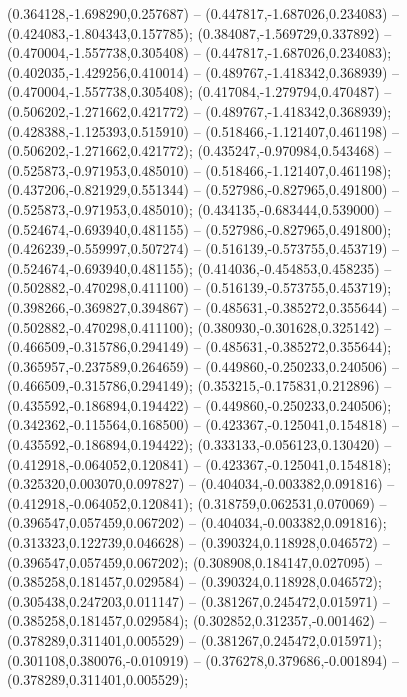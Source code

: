  (0.364128,-1.698290,0.257687) -- (0.447817,-1.687026,0.234083) -- (0.424083,-1.804343,0.157785);
 (0.384087,-1.569729,0.337892) -- (0.470004,-1.557738,0.305408) -- (0.447817,-1.687026,0.234083);
 (0.402035,-1.429256,0.410014) -- (0.489767,-1.418342,0.368939) -- (0.470004,-1.557738,0.305408);
 (0.417084,-1.279794,0.470487) -- (0.506202,-1.271662,0.421772) -- (0.489767,-1.418342,0.368939);
 (0.428388,-1.125393,0.515910) -- (0.518466,-1.121407,0.461198) -- (0.506202,-1.271662,0.421772);
 (0.435247,-0.970984,0.543468) -- (0.525873,-0.971953,0.485010) -- (0.518466,-1.121407,0.461198);
 (0.437206,-0.821929,0.551344) -- (0.527986,-0.827965,0.491800) -- (0.525873,-0.971953,0.485010);
 (0.434135,-0.683444,0.539000) -- (0.524674,-0.693940,0.481155) -- (0.527986,-0.827965,0.491800);
 (0.426239,-0.559997,0.507274) -- (0.516139,-0.573755,0.453719) -- (0.524674,-0.693940,0.481155);
 (0.414036,-0.454853,0.458235) -- (0.502882,-0.470298,0.411100) -- (0.516139,-0.573755,0.453719);
 (0.398266,-0.369827,0.394867) -- (0.485631,-0.385272,0.355644) -- (0.502882,-0.470298,0.411100);
 (0.380930,-0.301628,0.325142) -- (0.466509,-0.315786,0.294149) -- (0.485631,-0.385272,0.355644);
 (0.365957,-0.237589,0.264659) -- (0.449860,-0.250233,0.240506) -- (0.466509,-0.315786,0.294149);
 (0.353215,-0.175831,0.212896) -- (0.435592,-0.186894,0.194422) -- (0.449860,-0.250233,0.240506);
 (0.342362,-0.115564,0.168500) -- (0.423367,-0.125041,0.154818) -- (0.435592,-0.186894,0.194422);
 (0.333133,-0.056123,0.130420) -- (0.412918,-0.064052,0.120841) -- (0.423367,-0.125041,0.154818);
 (0.325320,0.003070,0.097827) -- (0.404034,-0.003382,0.091816) -- (0.412918,-0.064052,0.120841);
 (0.318759,0.062531,0.070069) -- (0.396547,0.057459,0.067202) -- (0.404034,-0.003382,0.091816);
 (0.313323,0.122739,0.046628) -- (0.390324,0.118928,0.046572) -- (0.396547,0.057459,0.067202);
 (0.308908,0.184147,0.027095) -- (0.385258,0.181457,0.029584) -- (0.390324,0.118928,0.046572);
 (0.305438,0.247203,0.011147) -- (0.381267,0.245472,0.015971) -- (0.385258,0.181457,0.029584);
 (0.302852,0.312357,-0.001462) -- (0.378289,0.311401,0.005529) -- (0.381267,0.245472,0.015971);
 (0.301108,0.380076,-0.010919) -- (0.376278,0.379686,-0.001894) -- (0.378289,0.311401,0.005529);
